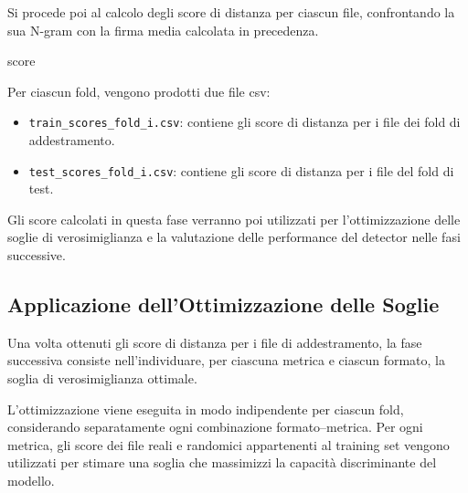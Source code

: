\documentclass{report}
\begin{document}
Si procede poi al calcolo degli score di distanza per ciascun file, confrontando la sua N-gram con la firma media calcolata in precedenza.

\bigskip

\begin{algorithm}[H]
\caption{CalcoloScore}


\Return score\;
\end{algorithm}

\bigskip

Per ciascun fold, vengono prodotti due file csv:
\begin{itemize}
    \item \texttt{train\_scores\_fold\_i.csv}: contiene gli score di distanza per i file dei fold di addestramento.
    \item \texttt{test\_scores\_fold\_i.csv}:  contiene gli score di distanza per i file del fold di test.
\end{itemize}

Gli score calcolati in questa fase verranno poi utilizzati per l'ottimizzazione delle soglie di verosimiglianza e la valutazione delle performance del detector nelle fasi successive.



\subsection{Applicazione dell’Ottimizzazione delle Soglie}

Una volta ottenuti gli score di distanza per i file di addestramento, la fase successiva consiste
nell'individuare, per ciascuna metrica e ciascun formato, la soglia di verosimiglianza ottimale.

L’ottimizzazione viene eseguita in modo indipendente per ciascun fold,
considerando separatamente ogni combinazione formato–metrica.
Per ogni metrica, gli score dei file reali e randomici appartenenti al training set
vengono utilizzati per stimare una soglia che massimizzi la capacità discriminante
del modello.

\bigskip
\end{document}
